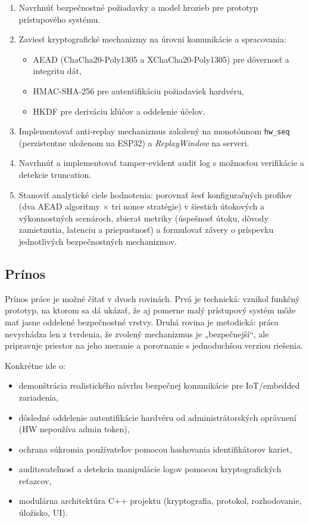 \documentclass[journal,a4paper,onecolumn]{IEEEtran}
\begin{document}
\begin{enumerate}[leftmargin=*,itemsep=2pt]
  \item Navrhnúť bezpečnostné požiadavky a model hrozieb pre prototyp prístupového systému.
  \item Zaviesť kryptografické mechanizmy na úrovni komunikácie a spracovania:
  \begin{itemize}[leftmargin=*,itemsep=2pt]
    \item AEAD (ChaCha20-Poly1305 a XChaCha20-Poly1305) pre dôvernosť a integritu dát\cite{RFC8439,XChaChaDraft},
    \item HMAC-SHA-256 pre autentifikáciu požiadaviek hardvéru\cite{FIPS1981},
    \item HKDF pre deriváciu kľúčov a oddelenie účelov\cite{RFC5869}.
  \end{itemize}
  \item Implementovať anti-replay mechanizmus založený na monotónnom \texttt{hw\_seq} (perzistentne uloženom na ESP32) a \emph{ReplayWindow} na serveri.
  \item Navrhnúť a implementovať tamper-evident audit log s možnosťou verifikácie a detekcie truncation.
  \item Stanoviť analytické ciele hodnotenia: porovnať šesť konfiguračných profilov (dva AEAD algoritmy $\times$ tri nonce stratégie) v šiestich útokových a výkonnostných scenároch, zbierať metriky (úspešnosť útoku, dôvody zamietnutia, latenciu a priepustnosť) a formulovať závery o príspevku jednotlivých bezpečnostných mechanizmov.
\end{enumerate}

\subsection{Prínos}

Prínos práce je možné čítať v dvoch rovinách. Prvá je technická: vznikol funkčný prototyp, na ktorom sa dá ukázať, že aj pomerne malý prístupový systém môže mať jasne oddelené bezpečnostné vrstvy. Druhá rovina je metodická: práca nevychádza len z tvrdenia, že zvolený mechanizmus je „bezpečnejší“, ale pripravuje priestor na jeho meranie a porovnanie s jednoduchšou verziou riešenia.

Konkrétne ide o:

\begin{itemize}[leftmargin=*,itemsep=2pt]
  \item demonštrácia realistického návrhu bezpečnej komunikácie pre IoT/embedded zariadenia,
  \item dôsledné oddelenie autentifikácie hardvéru od administrátorských oprávnení (HW nepoužíva admin token),
  \item ochrana súkromia používateľov pomocou hashovania identifikátorov kariet,
  \item auditovateľnosť a detekcia manipulácie logov pomocou kryptografických reťazcov,
  \item modulárna architektúra C++ projektu (kryptografia, protokol, rozhodovanie, úložisko, UI).
\end{itemize}
\end{document}
